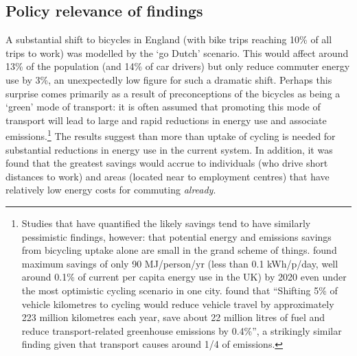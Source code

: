 \documentclass[a4paper, 11pt, twoside]{Thesis}
\begin{document}
\subsection{Policy relevance of findings}
A substantial shift to bicycles in England (with bike
trips reaching 10\% of all trips to work) was modelled by the `go Dutch' scenario.
This would affect around 13\% of the population (and 14\% of car drivers)
but only reduce commuter energy use by 3\%, an unexpectedly low figure for
such a dramatic shift.
Perhaps this surprise comes primarily as a result of preconceptions of the
bicycles as being a `green' mode of transport: it is
often assumed that promoting this mode of transport will lead to
large and rapid reductions in energy use and associate
emissions.\footnote{Studies
that
have quantified the likely savings tend to have similarly pessimistic
findings, however: that potential energy and emissions savings from bicycling
uptake alone are small in the grand scheme of things. \citet{Lovelace2011-assessing}
found maximum savings of only 90 MJ/person/yr (less than 0.1 kWh/p/day, well
around 0.1\% of current per capita energy use in the UK) by 2020 even under
the most optimistic cycling scenario in one city. \citet{Lindsay2011}
found that ``Shifting 5\% of vehicle kilometres to cycling would reduce
vehicle travel by approximately 223 million kilometres each year, save
about 22 million litres of fuel and reduce transport-related greenhouse emissions
by 0.4\%'', a strikingly similar finding given that transport
causes around 1/4 of emissions. 
}
The
results suggest than more than uptake of cycling
is needed for substantial reductions in energy use in the current system.
In addition, it was found that the greatest savings would accrue to individuals
(who drive short distances to work) and areas (located near to employment
centres) that have relatively low energy costs for commuting \emph{already}.
\end{document}
